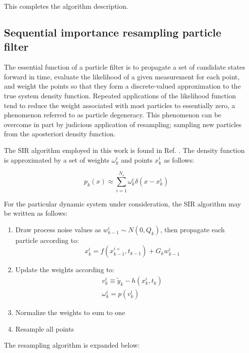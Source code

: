 \documentclass[]{article}
\begin{document}
This completes the algorithm description.

\subsection{Sequential importance resampling particle filter}

The essential function of a particle filter is to propagate a set of candidate states forward in time, evaluate the likelihood of a given measurement for each point, and weight the points so that they form a discrete-valued approximation to the true system density function. Repeated applications of the likelihood function tend to reduce the weight associated with most particles to essentially zero, a phenomenon referred to as particle degeneracy. This phenomenon can be overcome in part by judicious application of resampling; sampling new particles from the aposteriori density function.

The SIR algorithm employed in this work is found in Ref. \cite{arulampalam}. The density function is approximated by a set of weights $\omega^{i}_k$ and points $x^{i}_k$ as follows:

\begin{equation}
p_k(x) \approx \sum_{i=1}^{N_s} \omega^{i}_k \delta(x-x^{i}_k)
\end{equation}

For the particular dynamic system under consideration, the SIR algorithm may be written as follows:

\begin{enumerate}
\item Draw process noise values as $w^i_{k-1} \sim N(0,Q_k)$, then propagate each particle according to:
\begin{equation}
x_k^{i} = f(x_{k-1}^{i+},t_{k-1}) + G_k w^i_{k-1}
\label{eq:pf_eqom}
\end{equation}
\item Update the weights according to:
\begin{align}
v_k^i \equiv \tilde{y}_k - h(x_k^i,t_k) \\
\omega_k^i = p(v_k^i)
\end{align}
\item Normalize the weights to sum to one
\item Resample all points
\end{enumerate}

The resampling algorithm is expanded below:
\end{document}
